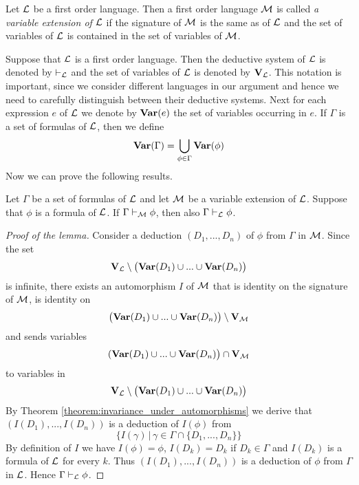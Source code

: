 \begin{definition}
Let ${\mathcal L}$ be a first order language. Then a first order language ${\mathcal M}$ is called \textit{a variable extension of ${\mathcal L}$} if the signature of ${\mathcal M}$ is the same as of ${\mathcal L}$ and the set of variables of ${\mathcal L}$ is contained in the set of variables of ${\mathcal M}$.
\end{definition}
\noindent
Suppose that ${\mathcal L}$ is a first order language. Then the deductive system of ${\mathcal L}$ is denoted by $\vdash_{{\mathcal L}}$ and the set of variables of ${\mathcal L}$ is denoted by $\mathbf{V}_{\mathcal L}$. This notation is important, since we consider different languages in our argument and hence we need to carefully distinguish between their deductive systems. Next for each expression $e$ of ${\mathcal L}$ we denote by $\mathbf{Var}(e)$ the set of variables occurring in $e$. If $\Gamma$ is a set of formulas of ${\mathcal L}$, then we define
$$\mathbf{Var}(\Gamma) = \bigcup_{\phi \in \Gamma} \mathbf{Var}(\phi)$$
Now we can prove the following results.

\begin{lemma}\label{lemma:deduction_in_variable_extensions_of_a_formula_that_belongs_to_extended_language}
Let $\Gamma$ be a set of formulas of ${\mathcal L}$ and let ${\mathcal M}$ be a variable extension of ${\mathcal L}$. Suppose that $\phi$ is a formula of ${\mathcal L}$. If $\Gamma \vdash_{{\mathcal M}} \phi$, then also $\Gamma \vdash_{{\mathcal L}} \phi$.
\end{lemma}
\begin{proof}[Proof of the lemma]
Consider a deduction $(D_1, ..., D_n)$ of $\phi$ from $\Gamma$ in ${\mathcal M}$. Since the set
$$\mathbf{V}_{{\mathcal L}} \setminus \big(\mathbf{Var}(D_1) \cup ... \cup \mathbf{Var}(D_n)\big)$$
is infinite, there exists an automorphism $I$ of ${\mathcal M}$ that is identity on the signature of ${\mathcal M}$, is identity on
$$\big(\mathbf{Var}(D_1) \cup ... \cup \mathbf{Var}(D_n)\big) \setminus \mathbf{V}_{{\mathcal M}}$$
and sends variables
$$(\mathbf{Var}(D_1) \cup ... \cup \mathbf{Var}(D_n)\big) \cap \mathbf{V}_{{\mathcal M}}$$
to variables in
$$\mathbf{V}_{{\mathcal L}} \setminus \big(\mathbf{Var}(D_1) \cup ... \cup \mathbf{Var}(D_n)\big)$$
By Theorem \ref{theorem:invariance_under_automorphisms} we derive that $(I(D_1),...,I(D_n))$ is a deduction of $I(\phi)$ from
$$\big\{I(\gamma)\,\big|\,\gamma \in \Gamma \cap \{D_1,...,D_n\}\big\}$$
By definition of $I$ we have $I(\phi) = \phi$, $I(D_k) = D_k$ if $D_k \in \Gamma$ and $I(D_k)$ is a formula of ${\mathcal L}$ for every $k$. Thus $\left(I(D_1),...,I(D_n)\right)$ is a deduction of $\phi$ from $\Gamma$ in ${\mathcal L}$. Hence $\Gamma \vdash_{{\mathcal L}} \phi$.
\end{proof}

